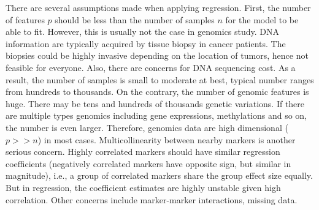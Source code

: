 There are several assumptions made when applying regression. First, the number of features $p$ should be less than the number of samples $n$ for the model to be able to fit. However, this is usually not the case in genomics study. DNA information are typically acquired by tissue biopsy in cancer patients. The biopsies could be highly invasive depending on the location of tumors, hence not feasible for everyone. Also, there are concerns for DNA sequencing cost. As a result, the number of samples is small to moderate at best, typical number ranges from hundreds to thousands. On the contrary, the number of genomic features is huge. There may be tens and hundreds of thousands genetic variations. If there are multiple types genomics including gene expressions, methylations and so on, the number is even larger. Therefore, genomics data are high dimensional ($p>>n$) in most cases. Multicollinearity between nearby markers is another serious concern. Highly correlated markers should have similar regression coefficients (negatively correlated markers have opposite sign, but similar in magnitude), i.e., a group of correlated markers share the group effect size equally. But in regression, the coefficient estimates are highly unstable given high correlation. Other concerns include marker-marker interactions, missing data. 


